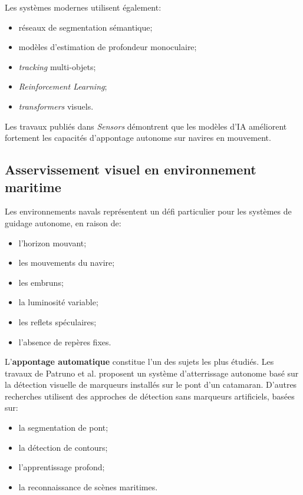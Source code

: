 \documentclass[12pt, a4paper, twoside, openright]{report}
\begin{document}
Les systèmes modernes utilisent également:
\begin{itemize}
    \item réseaux de segmentation sémantique;
    \item modèles d’estimation de profondeur monoculaire;
    \item \textit{tracking} multi-objets;
    \item \textit{Reinforcement Learning};
    \item \textit{transformers} visuels.
\end{itemize}

Les travaux publiés dans \textit{Sensors} \cite{sensors2022drones} démontrent que les modèles d’IA améliorent fortement les capacités d’appontage autonome sur navires en mouvement.

\subsection{Asservissement visuel en environnement maritime}
Les environnements navals représentent un défi particulier pour les systèmes de guidage autonome, en raison de:
\begin{itemize}
    \item l’horizon mouvant;
    \item les mouvements du navire;
    \item les embruns;
    \item la luminosité variable;
    \item les reflets spéculaires;
    \item l’absence de repères fixes.
\end{itemize}

L’\textbf{appontage automatique} constitue l’un des sujets les plus étudiés. Les travaux de Patruno et al.\cite{patruno2021visual} proposent un système d’atterrissage autonome basé sur la détection visuelle de marqueurs installés sur le pont d’un catamaran. D’autres recherches utilisent des approches de détection sans marqueurs artificiels, basées sur:
\begin{itemize}
    \item la segmentation de pont;
    \item la détection de contours;
    \item l’apprentissage profond;
    \item la reconnaissance de scènes maritimes.
\end{itemize}
\end{document}
